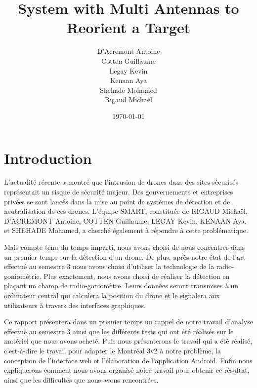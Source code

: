 \documentclass[a4paper, 11pt, oneside, oldfontcommands]{memoir}
\title{System with Multi Antennas to Reorient a Target}
\author{D'Acremont Antoine\\Cotten Guillaume\\Legay Kevin\\Kenaan Aya\\Shehade Mohamed\\Rigaud Michaël}
\date{\today}
\newcounter{rem}[chapter]
\newcounter{th}[chapter]
\newcommand{\cad}{c'est-à-dire }
\begin{document}
\maketitle
\thispagestyle{empty}
\newpage

\tableofcontents





\chapter*{Introduction}

L’actualité récente a montré que l’intrusion de drones dans des sites sécurisés représentait un risque de sécurité majeur. Des gouvernements et entreprises privées se sont lancés dans la mise au point de systèmes de détection et de neutralisation de ces drones. L'équipe SMART, constituée de RIGAUD Michaël, D'ACREMONT Antoine, COTTEN Guillaume, LEGAY Kevin, KENAAN Aya, et SHEHADE Mohamed, a cherché également à répondre à cette problématique.

Mais compte tenu du temps imparti, nous avons choisi de nous concentrer dans un premier temps sur la détection d'un drone. De plus, après notre état de l'art effectué au semestre 3 nous avons choisi d'utiliser la technologie de la radio-goniométrie.  Plus exactement, nous avons choisi de réaliser la détection en plaçant un champ de radio-goniomètre. Leurs données seront transmises à un ordinateur central qui calculera la position du drone et le signalera aux utilisateurs à travers des interfaces graphiques.

Ce rapport présentera dans un premier temps un rappel de notre travail d'analyse effectué au semestre 3 ainsi que les différents tests qui ont été réalisés sur le matériel que nous avons acheté. Puis nous présenterons le travail qui a été réalisé, \cad le travail pour adapter le Montréal 3v2 à notre problème, la conception de l'interface web et l'élaboration de l'application Android. Enfin nous expliquerons comment nous avons organisé notre travail pour obtenir ce résultat, ainsi que les difficultés que nous avons rencontrées.



\newpage	  

\end{document}
